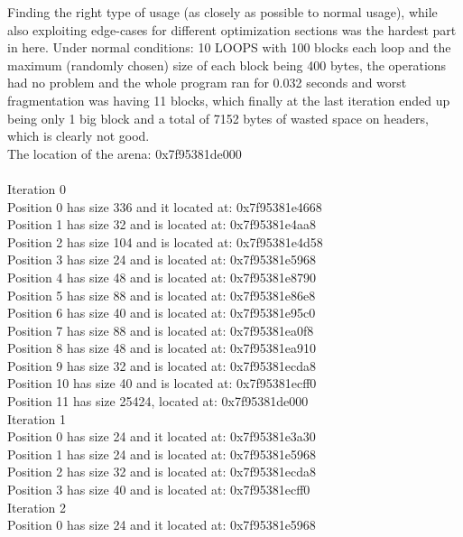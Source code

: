 \documentclass[a4paper,10pt]{article}
\begin{document}
Finding the right type of usage (as closely as possible to normal usage), while also exploiting edge-cases for different optimization sections was the hardest part in here. Under normal conditions: 10 LOOPS with 100 blocks each loop and the maximum (randomly chosen) size of each block being 400 bytes, the operations had no problem and the whole program ran for 0.032 seconds and worst fragmentation was having 11 blocks, which finally at the last iteration ended up being only 1 big block and a total of 7152 bytes of wasted space on headers, which is clearly not good.\\
\vspace{5mm}
\vspace{5mm}
The location of the arena: 0x7f95381de000\\
  \\
Iteration 0\\
Position 0 has size 336 and it located at: 0x7f95381e4668\\
Position 1 has size 32 and is located at: 0x7f95381e4aa8\\
Position 2 has size 104 and is located at: 0x7f95381e4d58\\
Position 3 has size 24 and is located at: 0x7f95381e5968\\
Position 4 has size 48 and is located at: 0x7f95381e8790\\
Position 5 has size 88 and is located at: 0x7f95381e86e8\\
Position 6 has size 40 and is located at: 0x7f95381e95c0\\
Position 7 has size 88 and is located at: 0x7f95381ea0f8\\
Position 8 has size 48 and is located at: 0x7f95381ea910\\
Position 9 has size 32 and is located at: 0x7f95381ecda8\\
Position 10 has size 40 and is located at: 0x7f95381ecff0\\
Position 11 has size 25424, located at: 0x7f95381de000\\
Iteration 1\\
Position 0 has size 24 and it located at: 0x7f95381e3a30\\
Position 1 has size 24 and is located at: 0x7f95381e5968\\
Position 2 has size 32 and is located at: 0x7f95381ecda8\\
Position 3 has size 40 and is located at: 0x7f95381ecff0\\
Iteration 2\\
Position 0 has size 24 and it located at: 0x7f95381e5968\\
\end{document}
